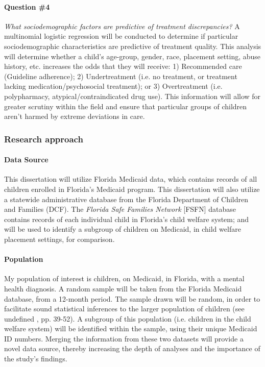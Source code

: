 \documentclass[twocolumn, serif, rga, authordate]{jote-article}
\begin{document}
\paragraph{Question \#4} \emph{What sociodemographic factors are
predictive of treatment discrepancies?} A multinomial logistic
regression will be conducted to determine if particular sociodemographic
characteristics are predictive of treatment quality. This analysis will
determine whether a child's age-group, gender, race, placement setting,
abuse history, etc. increases the odds that they will receive: 1)
Recommended care (Guideline adherence); 2) Undertreatment (i.e. no
treatment, or treatment lacking medication/psychosocial treatment); or
3) Overtreatment (i.e. polypharmacy, atypical/contraindicated drug use).
This information will allow for greater scrutiny within the field and
ensure that particular groups of children aren't harmed by extreme
deviations in care.


\subsubsection*{Research approach}


\paragraph{Data Source} This dissertation will utilize Florida Medicaid
data, which contains records of all children enrolled in Florida's
Medicaid program. This dissertation will also utilize a statewide
administrative database from the Florida Department of Children and
Families (DCF). The \emph{Florida Safe Families Network} {[}FSFN{]}
database contains records of each individual child in Florida's child
welfare system; and will be used to identify a subgroup of children on
Medicaid, in child welfare placement settings, for comparison.

\paragraph{Population} My population of interest is children, on Medicaid,
in Florida, with a mental health diagnosis. A random sample will be
taken from the Florida Medicaid database, from a 12-month period. The
sample drawn will be random, in order to facilitate sound statistical
inferences to the larger population of children (see undefined \citeyear{Berk2004}, pp.
39-52). A subgroup of this population (i.e. children in the child
welfare system) will be identified within the sample, using their unique
Medicaid ID numbers. Merging the information from these two datasets
will provide a novel data source, thereby increasing the depth of
analyses and the importance of the study's findings.
\end{document}
